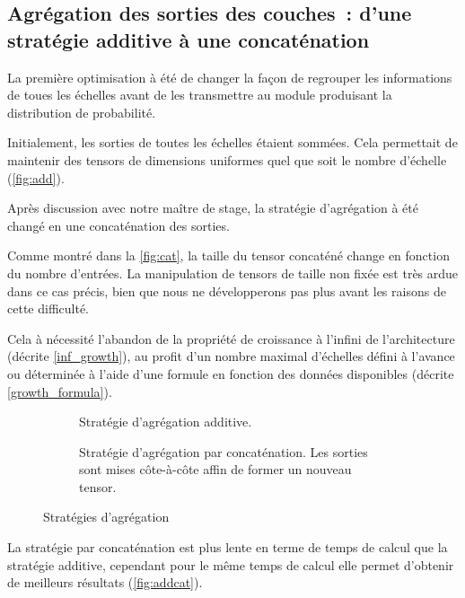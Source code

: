 \subsection[Agrégation des sorties des couches]{Agrégation des sorties des couches~: d'une stratégie additive à une concaténation}\label{subsec:addcat_}
La première optimisation à été de changer la façon de regrouper les informations de toues les \og échelles\fg{} avant de les transmettre au module produisant la distribution de probabilité.

Initialement, les sorties de toutes les \og échelles\fg{} étaient sommées. Cela permettait de maintenir des \glspl{tensor} de dimensions uniformes quel que soit le nombre d'\og échelle\fg{} (\autoref{fig:add}).

Après discussion avec notre maître de stage, la stratégie d'agrégation à été changé en une concaténation des sorties.

Comme montré dans la \autoref{fig:cat}, la taille du \gls{tensor} concaténé change en fonction du nombre d'entrées.
La manipulation de \glspl{tensor} de taille non fixée est très ardue dans ce cas précis, bien que nous ne développerons pas plus avant les raisons de cette difficulté.

Cela à nécessité l'abandon de la propriété de croissance à l'infini de l'architecture (décrite \autoref{inf_growth}), au profit d'un nombre maximal d'échelles défini à l'avance ou déterminée à l'aide d'une formule en fonction des données disponibles (décrite \autoref{growth_formula}).

\begin{figure}[ht]
	\begin{subfigure}{0.45\textwidth}
		\centering
		\scalebox{1}{}
		\caption[Stratégie d'agrégation additive]{Stratégie d'agrégation additive.\vspace{2.5em}}\label{fig:add}
	\end{subfigure}
	\begin{subfigure}{0.45\textwidth}
		\centering
		\scalebox{1}{}
		\caption[Stratégie d'agrégation par concaténation]{Stratégie d'agrégation par concaténation. Les sorties sont mises côte-à-côte affin de former un nouveau \gls{tensor}.}\label{fig:cat}
	\end{subfigure} 
	\caption{Stratégies d'agrégation}
\end{figure}

La stratégie par concaténation est plus lente en terme de temps de calcul que la stratégie additive, cependant pour le même temps de calcul elle permet d'obtenir de meilleurs résultats (\autoref{fig:addcat}).

